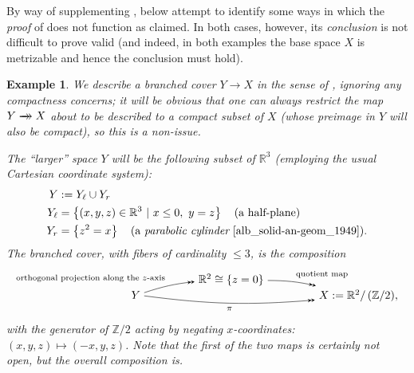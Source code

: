 \documentclass[11pt,leqno]{article}
\theoremstyle{plain}
\theoremstyle{plain}
\theoremstyle{plain}
\newtheorem{example}[lemma]{Example}
\numberwithin{equation}{section}
\theoremstyle{nonumberplain}
\newcommand\bR{{\mathbb R}}
\newcommand\bZ{{\mathbb Z}}
\newcommand\1{{\bf 1}}
\newcommand{\xrightarrowdbl}[2][]{%
  \xrightarrow[#1]{#2}\mathrel{\mkern-14mu}\rightarrow
}
\begin{document}
By way of supplementing ,  below attempt to identify some ways in which the {\it proof} of \cite[Theorem 4.3]{pt_brnch} does not function as claimed. In both cases, however, its {\it conclusion} is not difficult to prove valid (and indeed, in both examples the base space $X$ is metrizable and hence the conclusion must \cite[Theorem 2.12]{2409.03531v1} hold).

\begin{example}\label{ex:pt_2-3_sheets}
  We describe a branched cover $Y\to X$ in the sense of \cite[Definition 1.2]{pt_brnch}, ignoring any compactness concerns; it will be obvious that one can always restrict the map $Y\xrightarrowdbl{}X$ about to be described to a compact subset of $X$ (whose preimage in $Y$ will also be compact), so this is a non-issue.

  The ``larger'' space $Y$ will be the following subset of $\bR^3$ (employing the usual Cartesian coordinate system):
  \begin{equation*}
    \begin{aligned}
      Y
      &:=
        Y_{\ell}\cup Y_r\\
      Y_{\ell}
      &=
        \left\{(x,y,z)\in \bR^3\ |\ x\le 0,\ y=z\right\}
        \quad(\text{a half-plane})\\
      Y_{r}
      &=
        \left\{z^2=x\right\}
        \quad(\text{a {\it parabolic cylinder} \cite[\S 5.6, Exercise 6]{alb_solid-an-geom_1949}}). 
    \end{aligned}    
  \end{equation*}
  The branched cover, with fibers of cardinality $\le 3$, is the composition
  \begin{equation*}
    \begin{tikzpicture}[>=stealth,auto,baseline=(current  bounding  box.center)]
      \path[anchor=base] 
      (0,0) node (l) {$Y$}
      +(3,.5) node (u) {$\bR^2\cong \left\{z=0\right\}$}
      +(7,0) node (r) {$X:=\bR^2/\left(\bZ/2\right)$,}
      ;
      \draw[->>] (l) to[bend left=6] node[pos=.5,auto] {$\scriptstyle \text{orthogonal projection along the $z$-axis}$} (u);
      \draw[->>] (u) to[bend left=6] node[pos=.5,auto] {$\scriptstyle \text{quotient map}$} (r);
      \draw[->>] (l) to[bend right=6] node[pos=.5,auto,swap] {$\scriptstyle \pi$} (r);
    \end{tikzpicture}
  \end{equation*}
  with the generator of $\bZ/2$ acting by negating $x$-coordinates: $(x,y,z)\mapsto (-x,y,z)$. Note that the {\it first} of the two maps is certainly not open, but the overall composition is.


\end{example}
\end{document}
